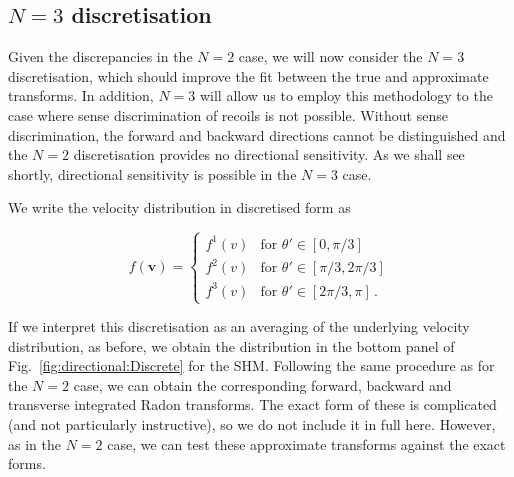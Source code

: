

\subsection{$N=3$ discretisation}

Given the discrepancies in the $N=2$ case, we will now consider the $N=3$ discretisation, which should improve the fit between the true and approximate transforms. In addition, $N=3$ will allow us to employ this methodology to the case where sense discrimination of recoils is not possible. Without sense discrimination, the forward and backward directions cannot be distinguished and the $N=2$ discretisation provides no directional sensitivity. As we shall see shortly, directional sensitivity is possible in the $N=3$ case.

We write the velocity distribution in discretised form as

\begin{equation}
\label{eq:directional:N3}
f(\mathbf{v}) =
\begin{cases}
f^1(v) & \textrm{for } \theta' \in [0, \pi/3] \\
f^2(v) & \textrm{for } \theta' \in [\pi/3, 2\pi/3] \\
f^3(v) & \textrm{for } \theta' \in [2\pi/3, \pi]\,.
\end{cases}
\end{equation}

If we interpret this discretisation as an averaging of the underlying velocity distribution, as before, we obtain the distribution in the bottom panel of Fig.~\ref{fig:directional:Discrete} for the SHM. Following the same procedure as for the $N=2$ case, we can obtain the corresponding forward, backward and transverse integrated Radon transforms. The exact form of these is complicated (and not particularly instructive), so we do not include it in full here. However, as in the $N=2$ case, we can test these approximate transforms against the exact forms. 

